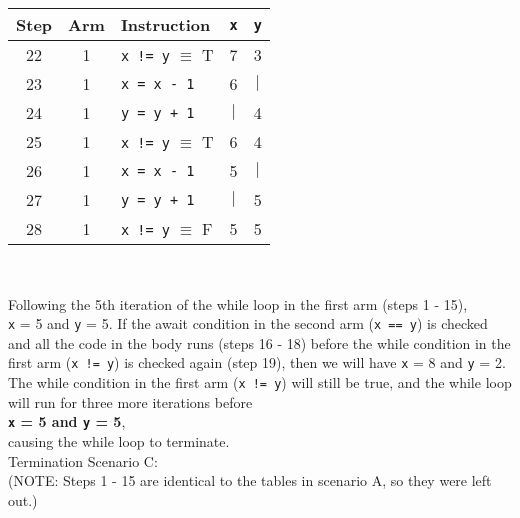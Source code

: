 \documentclass[11pt]{article}
\newcommand{\code}[1]{\texttt{#1}}
\begin{document}
\begin{enumerate}
\begin{enumerate}
\begin{tabular}{c |c | l | c | c }
		
	\end{tabular}\hspace{0.8cm}
	\begin{tabular}{c |c | l | c | c }
		Step & Arm & Instruction	&	\code{x}	&  \code{y}	\\
		\hline
		22 	& 1 & \code{x != y} $\equiv$ T	&	7	&	3\\
		23 	& 1 & \code{x = x - 1}			&	6	&	$|$\\
		24 	& 1 & \code{y = y + 1}			&	$|$	&	4\\
		25 	& 1 & \code{x != y} $\equiv$ T	&	6	&	4\\
		26 	& 1 & \code{x = x - 1}			&	5	&	$|$\\
		27 	& 1 & \code{y = y + 1}			&	$|$	&	5\\
		28 	& 1 & \code{x != y} $\equiv$ F	&	5	&	5\\
		
	\end{tabular}\\
	
	\newpage
	
	\hspace{0.8cm}Following the 5th iteration of the while loop in the first arm (steps 1 - 15),\\
	\code{x} = 5 and \code{y} = 5. If the await condition in the second arm (\code{x == y}) is checked and all the code in the body runs (steps 16 - 18) before the while condition in the first arm (\code{x != y}) is checked again (step 19), then we will have \code{x} = 8 and \code{y} = 2. The while condition in the first arm (\code{x != y}) will still be true, and the while loop will run for three more iterations before\\ 
	\textbf{\code{x} = 5 and \code{y} = 5}, \\
	causing the while loop to terminate.\\
	
	Termination Scenario C: \\
	(NOTE: Steps 1 - 15 are identical to the tables in scenario A, so they were left out.)\\
	

\end{enumerate}
\end{enumerate}
\end{document}
